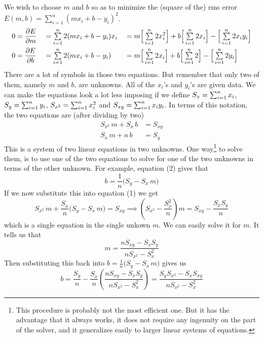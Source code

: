 \begin{solution}
We wish to choose $m$ and $b$ so as to minimize  the (square of the)
rms error $E(m,b)=\sum\limits_{i=1}^n (mx_i+b-y_i)^2$.
\begin{alignat*}{5}
0&=\pdiff{E}{m}&&=\smsum_{i=1}^n 2(mx_i+b-y_i)x_i
&&=m\Big[\smsum_{i=1}^n 2x^2_i\Big]+b\Big[\smsum_{i=1}^n 2x_i\Big]
-\Big[\smsum_{i=1}^n 2x_iy_i\Big]\\
0&=\pdiff{E}{b}&&=\smsum_{i=1}^n 2(mx_i+b-y_i)
&&=m\Big[\smsum_{i=1}^n 2x_i\Big]+b\Big[\smsum_{i=1}^n 2\Big]
-\Big[\smsum_{i=1}^n 2y_i\Big]
\end{alignat*}
There are a lot of symbols in those two equations. But remember that only two
of them, namely $m$ and $b$, are unknowns. All of the $x_i$'s and $y_i$'s are given data. We can make the equations look a lot less imposing if we define $S_x=\mathop{{\textstyle \sum}}_{i=1}^n x_i$, 
$S_y=\mathop{{\textstyle \sum}}_{i=1}^n y_i$, $S_{x^2}=\mathop{{\textstyle \sum}}_{i=1}^n x^2_i$ and
$S_{xy}=\mathop{{\textstyle \sum}}_{i=1}^n x_iy_i$. In terms of this notation, the two
 equations are (after dividing by two)
\begin{align*}
S_{x^2}\, m+S_x\, b&=S_{xy} \tag{\rm 1}\\
S_{x}\,m+n\,b&=S_{y} \tag{\rm 2}
\end{align*}
This is a system of two linear equations in two unknowns.
One way\footnote{This procedure is probably not the most efficient one. But it has the advantage that it always works, it does not require any ingenuity on the part of the solver, and it generalizes easily to larger linear systems of equations.} to solve them, is to use one of the two equations to solve
for one of the two unknowns in terms of the other unknown. For example,
equation (2) gives that
\begin{equation*}
b=\frac{1}{n}\big(S_y-S_x\,m\big)
\end{equation*}
If we now substitute this into equation (1) we get
\begin{equation*}
S_{x^2}\, m+\frac{S_x}{n}\big(S_y-S_x\,m\big)=S_{xy}
\implies \left(S_{x^2}-\frac{S_x^2}{n}\right)m = S_{xy} -\frac{S_xS_y}{n}
\end{equation*}
which is a single equation in the single unkown $m$. We can easily solve it for $m$. It tells us that
\begin{equation*}
m=\frac{nS_{xy}-S_xS_y}{nS_{x^2} -S_x^2}
\end{equation*}
Then substituting this back into $b=\frac{1}{n}\big(S_y-S_x\,m\big)$ gives us
\begin{equation*}
b=\frac{S_y}{n} 
      -\frac{S_x}{n}\left(\frac{nS_{xy}-S_xS_y}{nS_{x^2} -S_x^2}\right)
=\frac{S_yS_{x^2}-S_xS_{xy}}{nS_{x^2} -S_x^2}
\end{equation*}

\end{solution}

